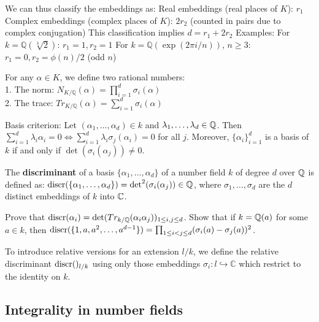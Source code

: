 \begin{outline}
            \2 We can thus classify the embeddings as:
                \3 Real embeddings (real places of $K$): $r_1$
                \3 Complex embeddings (complex places of $K$): $2r_2$ (counted in pairs due to complex conjugation)
            \2 This classification implies $d = r_1 + 2r_2$
        \1 Examples:
            \2 For $k = \mathbb{Q}(\sqrt[3]{2})$: $r_1 = 1, r_2 = 1$
            \2 For $k = \mathbb{Q}(\exp(2\pi i/n))$, $n \geq 3$: $r_1 = 0, r_2 = \phi(n)/2$ (odd $n$)
    \0 \begin{definition}
        For any $\alpha \in K$, we define two rational numbers:\\
        1. The norm: $N_{K/\mathbb{Q}}(\alpha) = \prod_{i=1}^d \sigma_i(\alpha)$\\
        2. The trace: $Tr_{K/\mathbb{Q}}(\alpha) = \sum_{i=1}^d \sigma_i(\alpha)$
    \end{definition}
        \1 Basis criterion: Let $(\alpha_1,\ldots,\alpha_d)\in k$ and $\lambda_1,\ldots,\lambda_d\in\mathbb{Q}$. Then $\sum_{i=1}^d \lambda_i\alpha_i = 0 \iff \sum_{i=1}^d \lambda_i \sigma_j(\alpha_i)=0$ for all $j$. 
        Moreover, $\{\alpha_i\}_{i=1}^d$ is a basis of $k$ if and only if $\det(\sigma_i(\alpha_j))\neq 0$.
    \0 \begin{definition}
        The \textbf{discriminant} of a basis $\{\alpha_1,\ldots,\alpha_d\}$ of a number field $k$ of degree $d$ over $\mathbb{Q}$ is defined as: $\operatorname{discr}({\{\alpha_1,\ldots,\alpha_d\}})=\det^2(\sigma_i(\alpha_j))\in\mathbb{Q}$, where $\sigma_1,\ldots,\sigma_d$ are the $d$ distinct embeddings of $k$ into $\mathbb{C}$.
    \end{definition}
    \begin{exercise}
        Prove that $\operatorname{discr}({\alpha_i}) = \det(Tr_{k/\mathbb{Q}}(\alpha_i\alpha_j))_{1 \leq i,j \leq d}$. Show that if $k = \mathbb{Q}(a)$ for some $a \in k$, then $\operatorname{discr}({\{1,a,a^2,\ldots,a^{d-1}\}}) = \prod_{1 \leq i < j \leq d}(\sigma_i(a)-\sigma_j(a))^2$.
    \end{exercise}
    \0 To introduce relative versions for an extension $l/k$, we define the relative discriminant $\operatorname{discr}({})_{l/k}$ using only those embeddings $\sigma_i : l \hookrightarrow \mathbb{C}$ which restrict to the identity on $k$.
\end{outline}

\subsection{Integrality in number fields}

